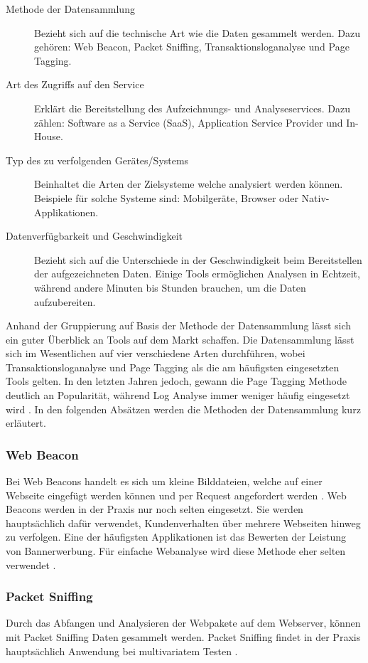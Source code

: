 \begin{description}
  \item[Methode der Datensammlung] Bezieht sich auf die technische Art wie die Daten gesammelt werden. Dazu gehören: Web Beacon, Packet Sniffing, Transaktionsloganalyse und Page Tagging.  
  \item[Art des Zugriffs auf den Service] Erklärt die Bereitstellung des Aufzeichnungs- und Analyseservices. Dazu zählen: Software as a Service (SaaS), Application Service Provider und In-House.
  \item[Typ des zu verfolgenden Gerätes/Systems] Beinhaltet die Arten der Zielsysteme welche analysiert werden können. Beispiele für solche Systeme sind: Mobilgeräte, Browser oder Nativ-Applikationen.
  \item[Datenverfügbarkeit und Geschwindigkeit] Bezieht sich auf die Unterschiede in der Geschwindigkeit beim Bereitstellen der aufgezeichneten Daten. Einige Tools ermöglichen Analysen in Echtzeit, während andere Minuten bis Stunden brauchen, um die Daten aufzubereiten.
\end{description}

Anhand der Gruppierung auf Basis der Methode der Datensammlung lässt sich ein guter Überblick an Tools auf dem Markt schaffen. Die Datensammlung lässt sich im Wesentlichen auf vier verschiedene Arten durchführen, wobei Transaktionsloganalyse und Page Tagging als die am häufigsten eingesetzten Tools gelten. In den letzten Jahren jedoch, gewann die Page Tagging Methode deutlich an Popularität, während Log Analyse immer weniger häufig eingesetzt wird \parencite{nakatani2011toolselectionmethod}. In den folgenden Absätzen werden die Methoden der Datensammlung kurz erläutert.

\subsubsection{Web Beacon} 
Bei Web Beacons handelt es sich um kleine Bilddateien, welche auf einer Webseite eingefügt werden können und per Request angefordert werden \parencite[S. 173]{nakatani2011toolselectionmethod}. Web Beacons werden in der Praxis nur noch selten eingesetzt. Sie werden hauptsächlich dafür verwendet, Kundenverhalten über mehrere Webseiten hinweg zu verfolgen. Eine der häufigsten Applikationen ist das Bewerten der Leistung von Bannerwerbung. Für einfache Webanalyse wird diese Methode eher selten verwendet \parencite[S. 3]{waisberg2009webShort}.

\subsubsection{Packet Sniffing}
Durch das Abfangen und Analysieren der Webpakete auf dem Webserver, können mit Packet Sniffing Daten gesammelt werden. Packet Sniffing findet in der Praxis hauptsächlich Anwendung bei multivariatem Testen \parencite[S. 4]{waisberg2009webShort}.

